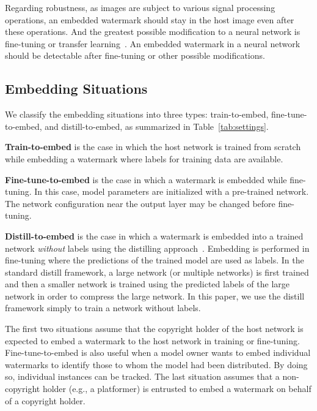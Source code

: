 \documentclass[10pt,twocolumn,letterpaper]{article}
\begin{document}
Regarding robustness, as images are subject to various signal processing operations, an embedded watermark should stay in the host image even after these operations.
And the greatest possible modification to a neural network is fine-tuning or transfer learning~\cite{Simonyan_iclr15}.
An embedded watermark in a neural network should be detectable after fine-tuning or other possible modifications.

\subsection{Embedding Situations}
\label{sec:situation}
We classify the embedding situations into three types: train-to-embed, fine-tune-to-embed, and distill-to-embed, as summarized in Table~\ref{tab:settings}.

\textbf{Train-to-embed} is the case in which the host network is trained from scratch while embedding a watermark where labels for training data are available.

\textbf{Fine-tune-to-embed} is the case in which a watermark is embedded while fine-tuning.
In this case, model parameters are initialized with a pre-trained network.
The network configuration near the output layer may be changed before fine-tuning.

\textbf{Distill-to-embed} is the case in which a watermark is embedded into a trained network \textit{without} labels using the distilling approach~\cite{hin_nipsw14}.
Embedding is performed in fine-tuning where the predictions of the trained model are used as labels.
In the standard distill framework, a large network (or multiple networks) is first trained and then a smaller network is trained using the predicted labels of the large network in order to compress the large network.
In this paper, we use the distill framework simply to train a network without labels.

The first two situations assume that the copyright holder of the host network is expected to embed a watermark to the host network in training or fine-tuning.
Fine-tune-to-embed is also useful when a model owner wants to embed individual watermarks to identify those to whom the model had been distributed.
By doing so, individual instances can be tracked.
The last situation assumes that a non-copyright holder (e.g., a platformer) is entrusted to embed a watermark on behalf of a copyright holder.
\end{document}
